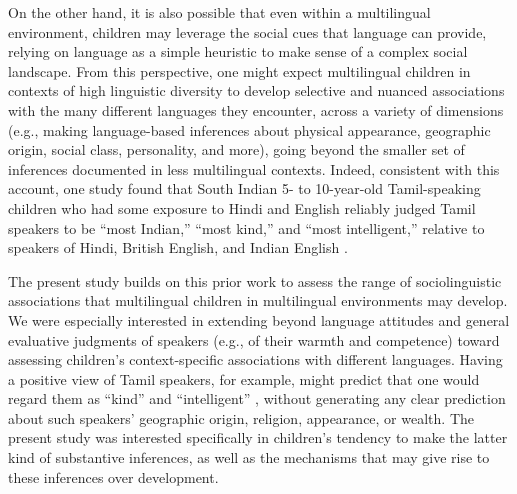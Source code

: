 \documentclass{foushee-adapted-preprint}
\begin{document}
On the other hand, it is also possible that even within a multilingual environment, children may leverage the social cues that language can provide, relying on language as a simple heuristic to make sense of a complex social landscape. From this perspective, one might expect multilingual children in contexts of high linguistic diversity to develop selective and nuanced associations with the many different languages they encounter, across a variety of dimensions (e.g., making language-based inferences about physical appearance, geographic origin, social class, personality, and more), going beyond the smaller set of inferences documented in less multilingual contexts. 
Indeed, consistent with this account, one study found that South Indian 5- to 10-year-old Tamil-speaking children who had some exposure to Hindi and English reliably judged Tamil speakers to be ``most Indian,'' ``most kind,'' and ``most intelligent,'' relative to speakers of Hindi, British English, and Indian English \parencite{santhanagopalan2021nationality}. %

The present study builds on this prior work to assess the range of sociolinguistic associations that multilingual children in multilingual environments may develop. 
We were especially interested in extending beyond language attitudes and general evaluative judgments of speakers (e.g., of their warmth and competence) toward assessing children's context-specific associations with different languages. 
Having a positive view of Tamil speakers, for example, might predict that one would regard them as ``kind'' and ``intelligent'' \parencite{santhanagopalan2021nationality}, without generating any clear prediction about such speakers' geographic origin, religion, appearance, or wealth. %
The present study was interested specifically in children's tendency to make the latter kind of substantive inferences, as well as the mechanisms that may give rise to these inferences over development.
\end{document}
